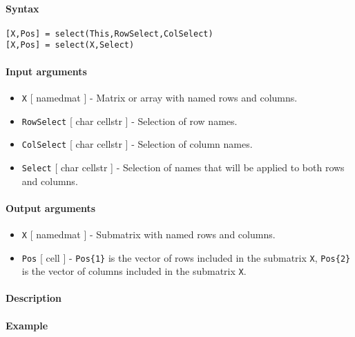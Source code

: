 


	\paragraph{Syntax}\label{syntax}

\begin{verbatim}
[X,Pos] = select(This,RowSelect,ColSelect)
[X,Pos] = select(X,Select)
\end{verbatim}

\paragraph{Input arguments}\label{input-arguments}

\begin{itemize}
\item
  \texttt{X} {[} namedmat {]} - Matrix or array with named rows and
  columns.
\item
  \texttt{RowSelect} {[} char \textbar{} cellstr {]} - Selection of row
  names.
\item
  \texttt{ColSelect} {[} char \textbar{} cellstr {]} - Selection of
  column names.
\item
  \texttt{Select} {[} char \textbar{} cellstr {]} - Selection of names
  that will be applied to both rows and columns.
\end{itemize}

\paragraph{Output arguments}\label{output-arguments}

\begin{itemize}
\item
  \texttt{X} {[} namedmat {]} - Submatrix with named rows and columns.
\item
  \texttt{Pos} {[} cell {]} - \texttt{Pos\{1\}} is the vector of rows
  included in the submatrix \texttt{X}, \texttt{Pos\{2\}} is the vector
  of columns included in the submatrix \texttt{X}.
\end{itemize}

\paragraph{Description}\label{description}

\paragraph{Example}\label{example}


